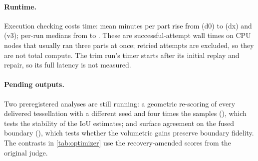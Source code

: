 \paragraph{Runtime.} Execution checking costs time: mean minutes per part rise from \hMinDZero{} (d0) to \hMinDX{} (dx) and \hMinVThree{} (v3); per-run medians from \hMedDZero{} to \hMedVThree. These are successful-attempt wall times on CPU nodes that usually ran three parts at once; retried attempts are excluded, so they are not total compute. The trim run's timer starts after its initial replay and repair, so its full latency is not measured.

\paragraph{Pending outputs.} Two preregistered analyses are still running: a geometric re-scoring of every delivered tessellation with a different seed and four times the samples (\hRejudge), which tests the stability of the IoU estimates; and surface agreement on the fused boundary (\hSurface), which tests whether the volumetric gains preserve boundary fidelity. The contrasts in \cref{tab:optimizer} use the recovery-amended scores from the original judge.
